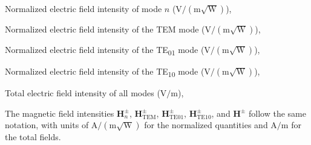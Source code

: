 \begin{description}[
	labelwidth   = 2.8cm,
	leftmargin   = 2.0cm,
	style        = sameline,
	font         = \normalfont
	]
	\item[$\mathbf{E}^\pm_n$] Normalized electric field intensity of mode $n$ 
	($\mathrm{V/(m\sqrt{W})}$),
	\item[$\mathbf{E}_\mathrm{TEM}^\pm$] Normalized electric field intensity 
	of the TEM mode ($\mathrm{V/(m\sqrt{W})}$),
	\item[$\mathbf{E}_\mathrm{TE01}^\pm$] Normalized electric field intensity 
	of the TE\textsubscript{01} mode ($\mathrm{V/(m\sqrt{W})}$),
	\item[$\mathbf{E}_\mathrm{TE10}^\pm$] Normalized electric field intensity 
	of the TE\textsubscript{10} mode ($\mathrm{V/(m\sqrt{W})}$),
	\item[$\mathbf{E}^\pm$] Total electric field intensity of all modes ($\mathrm{V/m}$),
\end{description}
\noindent The magnetic field intensities $\mathbf{H}_n^\pm$, $\mathbf{H}_\mathrm{TEM}^\pm$, 
$\mathbf{H}_\mathrm{TE01}^\pm$, $\mathbf{H}_\mathrm{TE10}^\pm$, and $\mathbf{H}^\pm$ 
follow the same notation, with units of $\mathrm{A/(m\sqrt{W})}$ for the normalized 
quantities and $\mathrm{A/m}$ for the total fields.
%
%
